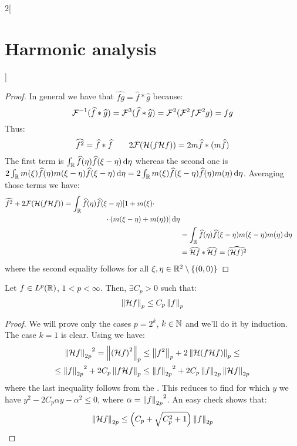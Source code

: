 \documentclass[../../../main_math.tex]{subfiles}
\begin{document}
\begin{multicols}{2}[\section{Harmonic analysis}]
\begin{proof}
    In general we have that $\widehat{fg}=\widehat{f}*\widehat{g}$ because:
    $$
      \mathcal{F}^{-1}(\widehat{f}*\widehat{g})=\mathcal{F}^3(\widehat{f}*\widehat{g})=\mathcal{F}^2(\mathcal{F}^2 f \mathcal{F}^2 g)=fg
    $$
    Thus:
    $$
      \widehat{f^2}= \widehat{f}*\widehat{f}\qquad
      2\mathcal{F}{(\mathcal{H}(f\mathcal{H} f))}=2m \widehat{f}*(m \widehat{f})
    $$
    The first term is $\int_{\mathbb{R}} \widehat{f}(\eta)\widehat{f}(\xi-\eta)\dd{\eta}$ whereas the second one is $2\int_{\mathbb{R}} m(\xi)\widehat{f}(\eta)m(\xi-\eta)\widehat{f}(\xi-\eta)\dd{\eta}=2\int_{\mathbb{R}} m(\xi)\widehat{f}(\xi-\eta)\widehat{f}(\eta)m(\eta)\dd{\eta}$.
    Averaging those terms we have:
    \begin{align*}
      \begin{split}
        \widehat{f^2}+2\mathcal{F}{(\mathcal{H}(f\mathcal{H} f))} & =\int_{\mathbb{R}} \widehat{f}(\eta)\widehat{f}(\xi-\eta)[1+m(\xi)\cdot\\
          &\hspace{2cm}\cdot(m(\xi-\eta)+m(\eta))]\dd{\eta}
      \end{split} \\
       & =\int_{\mathbb{R}} \widehat{f}(\eta)\widehat{f}(\xi-\eta)m(\xi-\eta)m(\eta)\dd{\eta}                 \\
       & =\widehat{\mathcal{H} f}*\widehat{\mathcal{H} f}=\widehat{(\mathcal{H} f)^2}
    \end{align*}
    where the second equality follows for all $\xi,\eta\in\mathbb{R}^2\setminus\{(0,0)\}$
  \end{proof}
  \begin{theorem}
    Let $f\in L^p(\mathbb{R})$, $1<p<\infty$. Then, $\exists C_p>0$ such that:
    $$
      \left\|\mathcal{H} f\right\|_p \leq C_p \left\|f\right\|_p
    $$
  \end{theorem}
  \begin{proof}
    We will prove only the cases $p=2^k$, $k\in\mathbb{N}$ and we'll do it by induction. The case $k=1$ is clear. Using  we have:
    \begin{multline*}
      {\left\|\mathcal{H}f\right\|_{2p}}^2=\left\|{(\mathcal{H} f)}^2\right\|_p\leq \left\|f^2\right\|_p+2\left\|\mathcal{H}(f\mathcal{H} f)\right\|_p\leq\\\leq {\left\|f\right\|_{2p}}^2+2C_p\left\|f\mathcal{H} f\right\|_{p}\leq {\left\|f\right\|_{2p}}^2+2C_p\left\|f\right\|_{2p}\left\|\mathcal{H} f\right\|_{2p}
    \end{multline*}
    where the last inequality follows from the . This reduces to find for which $y$ we have $y^2 - 2C_p \alpha y - \alpha^2\leq 0$, where $\alpha={\left\|f\right\|_{2p}}^2$. An easy check shows that:
    $$
      \left\|\mathcal{H} f\right\|_{2p}\leq \left(C_p + \sqrt{C_p^2+1}\right)\left\|f\right\|_{2p}
    $$
  \end{proof}

\end{multicols}
\end{document}
